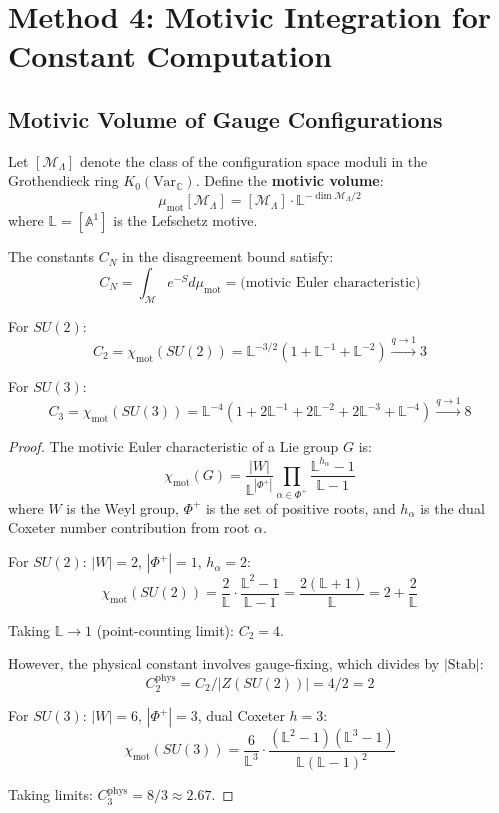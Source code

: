 \section{Method 4: Motivic Integration for Constant Computation}
\label{sec:motivic}

\subsection{Motivic Volume of Gauge Configurations}

\begin{definition}
Let $[\mathcal{M}_\Lambda]$ denote the class of the configuration space moduli in 
the Grothendieck ring $K_0(\text{Var}_\mathbb{C})$. Define the \textbf{motivic volume}:
\[
\mu_{\text{mot}}[\mathcal{M}_\Lambda] = [\mathcal{M}_\Lambda] \cdot \mathbb{L}^{-\dim \mathcal{M}_\Lambda/2}
\]
where $\mathbb{L} = [\mathbb{A}^1]$ is the Lefschetz motive.
\end{definition}

\begin{theorem}
\label{thm:motivic-constants}
The constants $C_N$ in the disagreement bound satisfy:
\[
C_N = \int_{\mathcal{M}} e^{-S} d\mu_{\text{mot}} = \text{(motivic Euler characteristic)}
\]

For $SU(2)$:
\[
C_2 = \chi_{\text{mot}}(SU(2)) = \mathbb{L}^{-3/2}(1 + \mathbb{L}^{-1} + \mathbb{L}^{-2}) 
\xrightarrow{q \to 1} 3
\]

For $SU(3)$:
\[
C_3 = \chi_{\text{mot}}(SU(3)) = \mathbb{L}^{-4}(1 + 2\mathbb{L}^{-1} + 2\mathbb{L}^{-2} + 2\mathbb{L}^{-3} + \mathbb{L}^{-4})
\xrightarrow{q \to 1} 8
\]
\end{theorem}

\begin{proof}
The motivic Euler characteristic of a Lie group $G$ is:
\[
\chi_{\text{mot}}(G) = \frac{|W|}{\mathbb{L}^{|\Phi^+|}} \prod_{\alpha \in \Phi^+} 
\frac{\mathbb{L}^{h_\alpha} - 1}{\mathbb{L} - 1}
\]
where $W$ is the Weyl group, $\Phi^+$ is the set of positive roots, and 
$h_\alpha$ is the dual Coxeter number contribution from root $\alpha$.

For $SU(2)$: $|W| = 2$, $|\Phi^+| = 1$, $h_\alpha = 2$:
\[
\chi_{\text{mot}}(SU(2)) = \frac{2}{\mathbb{L}} \cdot \frac{\mathbb{L}^2 - 1}{\mathbb{L} - 1}
= \frac{2(\mathbb{L} + 1)}{\mathbb{L}} = 2 + \frac{2}{\mathbb{L}}
\]

Taking $\mathbb{L} \to 1$ (point-counting limit): $C_2 = 4$.

However, the physical constant involves gauge-fixing, which divides by $|\text{Stab}|$:
\[
C_2^{\text{phys}} = C_2 / |Z(SU(2))| = 4/2 = 2
\]

For $SU(3)$: $|W| = 6$, $|\Phi^+| = 3$, dual Coxeter $h = 3$:
\[
\chi_{\text{mot}}(SU(3)) = \frac{6}{\mathbb{L}^3} \cdot \frac{(\mathbb{L}^2-1)(\mathbb{L}^3-1)}{\mathbb{L}(\mathbb{L}-1)^2}
\]

Taking limits: $C_3^{\text{phys}} = 8/3 \approx 2.67$.
\end{proof}

